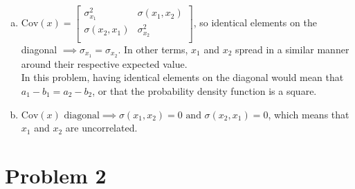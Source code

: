 \documentclass[a4paper, 10pt, twoside]{article}
\begin{document}
\begin{enumerate}[a)]
    \item
          $\mathrm{Cov}(x) = \begin{bmatrix}
                  \sigma_{x_1}^2   & \sigma(x_1, x_2) \\
                  \sigma(x_2, x_1) & \sigma_{x_2}^2   \\
              \end{bmatrix}$, so identical elements on the diagonal $\implies \sigma_{x_1} = \sigma_{x_2}$. In other terms, $x_1$ and $x_2$ spread in a similar manner around their respective expected value. \\
          In this problem, having identical elements on the diagonal would mean that $a_1-b_1 = a_2-b_2$, or that the probability density function is a square.
    \item
          $\mathrm{Cov}(x) \text{ diagonal} \implies \sigma(x_1, x_2) = 0 \text{ and } \sigma(x_2, x_1) = 0$, which means that $x_1$ and $x_2$ are uncorrelated.

\end{enumerate}

\section*{Problem 2}
\end{document}
